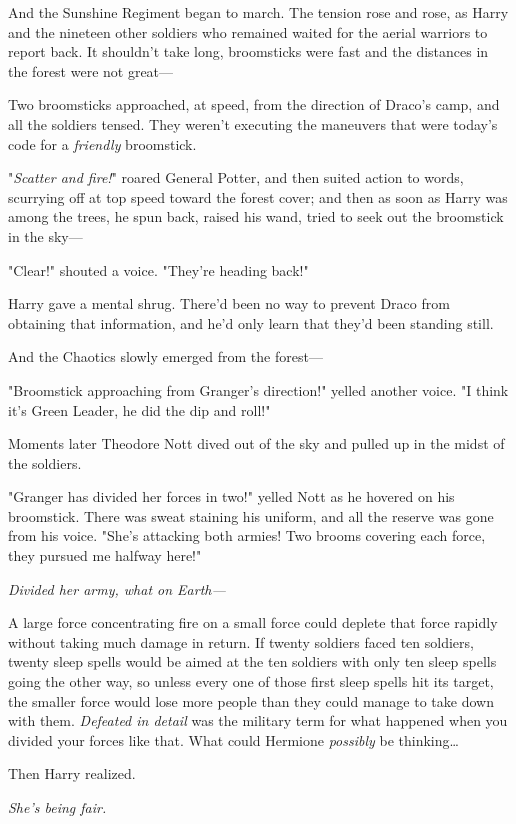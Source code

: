 And the Sunshine Regiment began to march.
\sbreak
The tension rose and rose, as Harry and the nineteen other soldiers who remained waited for the aerial warriors to report back. It shouldn't take long, broomsticks were fast and the distances in the forest were not great---

Two broomsticks approached, at speed, from the direction of Draco's camp, and all the soldiers tensed. They weren't executing the maneuvers that were today's code for a \emph{friendly} broomstick.

"\emph{Scatter and fire!}" roared General Potter, and then suited action to words, scurrying off at top speed toward the forest cover; and then as soon as Harry was among the trees, he spun back, raised his wand, tried to seek out the broomstick in the sky---

"Clear!" shouted a voice. "They're heading back!"

Harry gave a mental shrug. There'd been no way to prevent Draco from obtaining that information, and he'd only learn that they'd been standing still.

And the Chaotics slowly emerged from the forest---

"Broomstick approaching from Granger's direction!" yelled another voice. "I think it's Green Leader, he did the dip and roll!"

Moments later Theodore Nott dived out of the sky and pulled up in the midst of the soldiers.

"Granger has divided her forces in two!" yelled Nott as he hovered on his broomstick. There was sweat staining his uniform, and all the reserve was gone from his voice. "She's attacking both armies! Two brooms covering each force, they pursued me halfway here!"

\emph{Divided her army, what on Earth---}

A large force concentrating fire on a small force could deplete that force rapidly without taking much damage in return. If twenty soldiers faced ten soldiers, twenty sleep spells would be aimed at the ten soldiers with only ten sleep spells going the other way, so unless every one of those first sleep spells hit its target, the smaller force would lose more people than they could manage to take down with them. \emph{Defeated in detail} was the military term for what happened when you divided your forces like that. What could Hermione \emph{possibly} be thinking{\ldots}

Then Harry realized.

\emph{She's being fair.}

